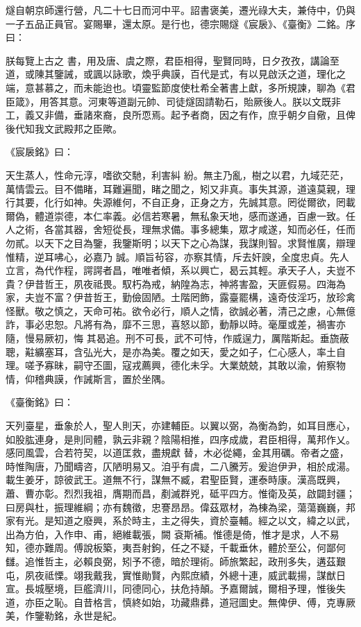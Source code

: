 \begin{pinyinscope}
 燧自朝京師還行營，凡二十七日而河中平。詔書褒美，遷光祿大夫，兼侍中，仍與一子五品正員官。宴賜畢，還太原。是行也，德宗賜燧《宸扆》、《臺衡》二銘。序曰：



 朕每覽上古之
 書，用及唐、虞之際，君臣相得，聖賢同時，日夕孜孜，講論至道，或陳其鑒誡，或諷以詠歌，煥乎典謨，百代是式，有以見啟沃之道，理化之端，意甚慕之，而未能迨也。頃靈監節度使杜希全著書上獻，多所規諫，聊為《君臣箴》，用答其意。河東等道副元帥、司徒燧固請勒石，貽厥後人。朕以文既非工，義又非備，垂諸來裔，良所恧焉。起予者商，因之有作，庶乎朝夕自儆，且俾後代知我文武殿邦之臣歟。



 《宸扆銘》曰：



 天生蒸人，性命元淳，嗜欲交馳，利害糾
 紛。無主乃亂，樹之以君，九域茫茫，萬情雲云。目不備睹，耳難遍聞，睹之聞之，矧又非真。事失其源，道遠莫親，理行其要，化行如神。失源維何，不自正身，正身之方，先誠其意。罔從爾欲，罔載爾偽，體道崇德，本仁率義。必信若寒暑，無私象天地，感而遂通，百慮一致。任人之術，各當其器，舍短從長，理無求備。事多總集，眾才咸遂，知而必任，任而勿貳。以天下之目為鑒，我鑒斯明；以天下之心為謀，我謀則智。求賢惟廣，辯理惟精，逆耳咈心，必嘉乃
 誠。順旨茍容，亦察其情，斥去奸諛，全度忠貞。先人立言，為代作程，諤諤者昌，唯唯者傾，系以興亡，曷云其輕。承天子人，夫豈不貴？伊昔哲王，夙夜祗畏。馭朽為戒，納隍為志，神將害盈，天匪假易。四海為家，夫豈不富？伊昔哲王，勤儉固陋。土階罔飾，露臺罷構，遠奇伎淫巧，放珍禽怪獸。敬之慎之，天命可祐。欲令必行，順人之情，欲誠必著，清己之慮，心無億詐，事必忠恕。凡將有為，靡不三思，喜怒以節，動靜以時。毫厘或差，禍害亦隨，慢易厥初，悔
 其曷追。刑不可長，武不可恃，作威逞力，厲階斯起。垂旒蔽聰，黈纊塞耳，含弘光大，是亦為美。覆之如天，愛之如子，仁心感人，率土自理。嗟予寡昧，嗣守丕圖，寇戎薦興，德化未孚。大業兢兢，其敢以渝，俯察物情，仰稽典謨，作誡斯言，置於坐隅。



 《臺衡銘》曰：



 天列臺星，垂象於人，聖人則天，亦建輔臣。以翼以弼，為衡為鈞，如耳目應心，如股肱連身，是則同體，孰云非親？陰陽相推，四序成歲，君臣相得，萬邦作乂。感同風雲，合若符契，以道匡救，盡規獻
 替，木必從繩，金其用礪。帝者之盛，時惟陶唐，乃聞疇咨，仄陋明易又。洎乎有虞，二八騰芳。爰迨伊尹，相於成湯。載生姜牙，諒彼武王。道無不行，謀無不臧，君聖臣賢，運泰時康。漢高既興，蕭、曹亦彰。烈烈我祖，膺期而昌，剷滅群兇，砥平四方。惟衛及英，啟闢封疆；曰房與杜，振理維綱；亦有魏徵，忠謇昂昂。偉茲眾材，為棟為梁，蕩蕩巍巍，邦家有光。是知道之廢興，系於時主，主之得失，資於臺輔。經之以文，緯之以武，出為方伯，入作申、甫，絕維載張，闕
 袞斯補。惟德是倚，惟才是求，人不易知，德亦難周。傅說板築，夷吾射鉤，任之不疑，千載垂休，體於至公，何鄙何讎。追惟哲主，必賴良弼，矧予不德，暗於理術。師旅繁起，政刑多失，遘茲艱屯，夙夜祗慄。翊我戴我，實惟勛賢，內熙庶績，外總十連，威武載揚，謀猷日宣。長城壓境，巨艦濟川，同德同心，扶危持顛。予嘉爾誠，爾相予理，惟後失道，亦臣之恥。自昔格言，慎終如始，功藏鼎彞，道冠圖史。無俾伊、傅，克專厥美，作鑒勒銘，永世是紀。




\end{pinyinscope}
